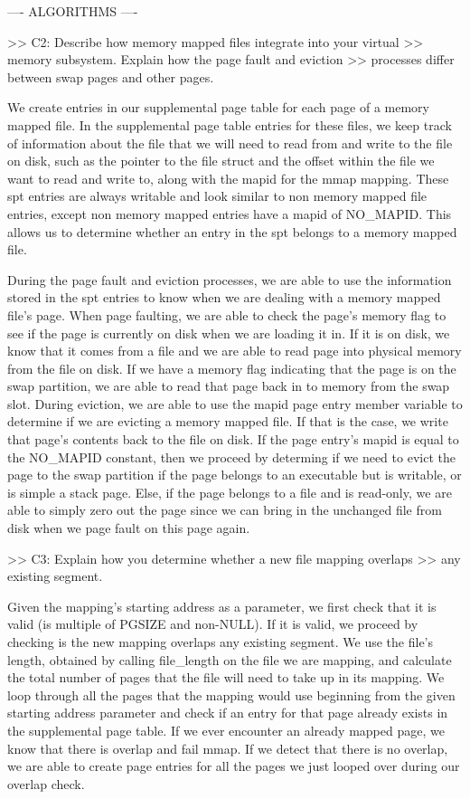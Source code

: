 ---- ALGORITHMS ----

>> C2: Describe how memory mapped files integrate into your virtual
>> memory subsystem.  Explain how the page fault and eviction
>> processes differ between swap pages and other pages.

We create entries in our supplemental page table for each page of a memory
mapped file. In the supplemental page table entries for these files,
we keep track of information about the file that we will need to
read from and write to the file on disk, such as the pointer to the file
struct and the offset within the file we want to read and write to, along
with the mapid for the mmap mapping. These spt entries are always writable
and look similar to non memory mapped file entries, except non memory mapped
entries have a mapid of NO_MAPID. This allows us to determine whether an 
entry in the spt belongs to a memory mapped file.

During the page fault and eviction processes, we are able to use the
information stored in the spt entries to know when we are dealing with
a memory mapped file's page. When page faulting, we are able to check the
page's memory flag to see if the page is currently on disk when we are
loading it in. If it is on disk, we know that it comes from a file and we
are able to read page into physical memory from the file on disk. If we
have a memory flag indicating that the page is on the swap partition, we
are able to read that page back in to memory from the swap slot. During 
eviction, we are able to use the mapid page entry member variable to
determine if we are evicting a memory mapped file. If that is the case,
we write that page's contents back to the file on disk. If the page entry's
mapid is equal to the NO_MAPID constant, then we proceed by determing if
we need to evict the page to the swap partition if the page belongs to an
executable but is writable, or is simple a stack page. Else, if the page
belongs to a file and is read-only, we are able to simply zero out the page
since we can bring in the unchanged file from disk when we page fault on
this page again.

>> C3: Explain how you determine whether a new file mapping overlaps
>> any existing segment.

Given the mapping's starting address as a parameter, we first check that it
is valid (is multiple of PGSIZE and non-NULL). If it is valid, we proceed by
checking is the new mapping overlaps any existing segment. We use the file's 
length, obtained by calling file_length on the file we are mapping, and
calculate the total number of pages that the file will need to take up in its 
mapping. We loop through all the pages that the mapping would use beginning
from the given starting address parameter and check if
an entry for that page already exists in the supplemental page table. If we
ever encounter an already mapped page, we know that there is overlap and
fail mmap. If we detect that there is no overlap, we are able to create page
entries for all the pages we just looped over during our overlap check.


